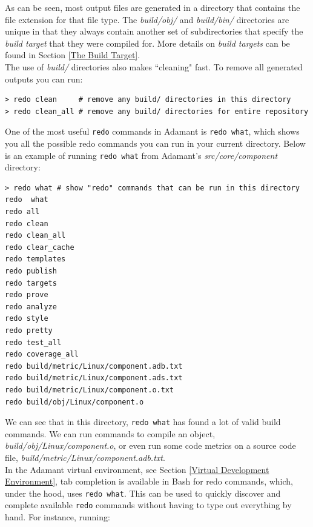 As can be seen, most output files are generated in a directory that contains the file extension for that file type. The \textit{build/obj/} and \textit{build/bin/} directories are unique in that they always contain another set of subdirectories that specify the \textit{build target} that they were compiled for. More details on \textit{build targets} can be found in Section \ref{The Build Target}. \\

The use of \textit{build/} directories also makes ``cleaning" fast. To remove all generated outputs you can run:

\vspace{5mm} %
\begin{verbatim}
> redo clean     # remove any build/ directories in this directory
> redo clean_all # remove any build/ directories for entire repository
\end{verbatim}
\vspace{5mm} %

One of the most useful \texttt{redo} commands in Adamant is \texttt{redo what}, which shows you all the possible redo commands you can run in your current directory. Below is an example of running \texttt{redo what} from Adamant's \textit{src/core/component} directory:

\vspace{5mm} %
\begin{verbatim}
> redo what # show "redo" commands that can be run in this directory
redo  what
redo all
redo clean
redo clean_all
redo clear_cache
redo templates
redo publish
redo targets
redo prove
redo analyze
redo style
redo pretty
redo test_all
redo coverage_all
redo build/metric/Linux/component.adb.txt
redo build/metric/Linux/component.ads.txt
redo build/metric/Linux/component.o.txt
redo build/obj/Linux/component.o
\end{verbatim}
\vspace{5mm} %

We can see that in this directory, \texttt{redo what} has found a lot of valid build commands. We can run commands to compile an object, \textit{build/obj/Linux/component.o}, or even run some code metrics on a source code file, \textit{build/metric/Linux/component.adb.txt}. \\

In the Adamant virtual environment, see Section \ref{Virtual Development Environment}, tab completion is available in Bash for redo commands, which, under the hood, uses \texttt{redo what}. This can be used to quickly discover and complete available \texttt{redo} commands without having to type out everything by hand. For instance, running:

